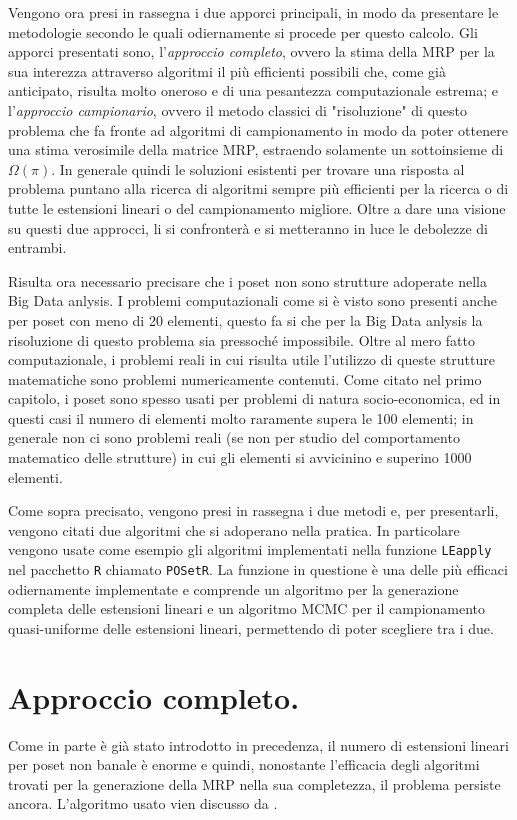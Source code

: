 \documentclass{report}
\begin{document}
Vengono ora presi in rassegna i due apporci principali, in modo da presentare le metodologie secondo le quali odiernamente si procede per questo calcolo. Gli apporci presentati sono, l'\textit{approccio completo}, ovvero la stima della MRP per la sua interezza attraverso algoritmi il più efficienti possibili che, come già anticipato, risulta molto oneroso e di una pesantezza computazionale estrema; e l'\textit{approccio campionario}, ovvero il metodo classici di "risoluzione" di questo problema che fa fronte ad algoritmi di campionamento in modo da poter ottenere una stima verosimile della matrice MRP, estraendo solamente un sottoinsieme di $\Omega(\pi)$. In generale quindi le soluzioni esistenti per trovare una risposta al problema puntano alla ricerca di algoritmi sempre più efficienti per la ricerca o di tutte le estensioni lineari o del campionamento migliore. Oltre a dare una visione su questi due approcci, li si confronterà e si metteranno in luce le debolezze di entrambi.


Risulta ora necessario precisare che i poset non sono strutture adoperate nella Big Data anlysis. I problemi computazionali come si è visto sono presenti anche per poset con meno di 20 elementi, questo fa si che per la Big Data anlysis la risoluzione di questo problema sia pressoché impossibile. Oltre al mero fatto computazionale, i problemi reali in cui risulta utile l'utilizzo di queste strutture matematiche sono problemi numericamente contenuti. Come citato nel primo capitolo, i poset sono spesso usati per problemi di natura socio-economica, ed in questi casi il numero di elementi molto raramente supera le 100 elementi; in generale non ci sono problemi reali (se non per studio del comportamento matematico delle strutture) in cui gli elementi si avvicinino e superino 1000 elementi. 


Come sopra precisato, vengono presi in rassegna i due metodi e, per presentarli, vengono citati due algoritmi che si adoperano nella pratica. In particolare vengono usate come esempio gli algoritmi implementati nella funzione \texttt{LEapply} nel pacchetto \texttt{R} chiamato \texttt{POSetR}. La funzione in questione è una delle più efficaci odiernamente implementate e comprende un algoritmo per la generazione completa delle estensioni lineari e un algoritmo MCMC per il campionamento quasi-uniforme delle estensioni lineari, permettendo di poter scegliere tra i due.


\section{Approccio completo.}
Come in parte è già stato introdotto in precedenza, il numero di estensioni lineari per poset non banale è enorme e quindi, nonostante l'efficacia degli algoritmi trovati per la generazione della MRP nella sua completezza, il problema persiste ancora. L'algoritmo usato vien discusso da \citet{habib2001efficient}.
\end{document}
